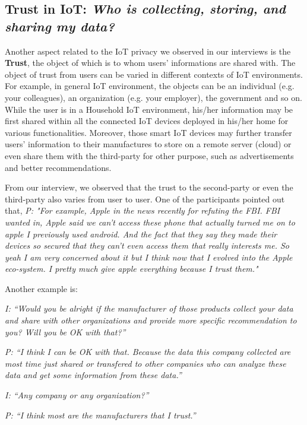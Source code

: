 \subsection{Trust in IoT: \textit{Who is collecting, storing, and sharing my data?}}
Another aspect related to the IoT privacy we observed in our interviews is the \textbf{Trust}, the object of which is to whom users' informations are shared with. The object of trust from users can be varied in different contexts of IoT environments. For example, in general IoT environment, the objects can be an individual (e.g. your colleagues), an organization (e.g. your employer), the government and so on. While the user is in a Household IoT environment, his/her information may be first shared within all the connected IoT devices deployed in his/her home for various functionalities. Moreover, those smart IoT devices may further transfer users' information to their manufactures to store on a remote server (cloud) or even share them with the third-party for other purpose, such as advertisements and better recommendations. 

From our interview, we observed that the trust to the second-party or even the third-party also varies from user to user. One of the participants pointed out that, \textit{P: "For example, Apple in the news recently for refuting the FBI. FBI wanted in, Apple said we can't access these phone that actually turned me on to apple I previously used android. And the fact that they say they made their devices so secured that they can't even access them that really interests me. So yeah I am very concerned about it but I think now that I evolved into the Apple eco-system. I pretty much give apple everything because I trust them."}

Another example is:

\textit{I: ``Would you be alright if the manufacturer of those products collect your data and share with other organizations and provide more specific recommendation to you? Will you be OK with that?''\\}

\textit{P: ``I think I can be OK with that. Because the data this company collected are most time just shared or transfered to other companies who can analyze these data and get some information from these data.''\\}

\textit{I: ``Any company or any organization?''\\}

\textit{P: ``I think most are the manufacturers that I trust.''\\}

